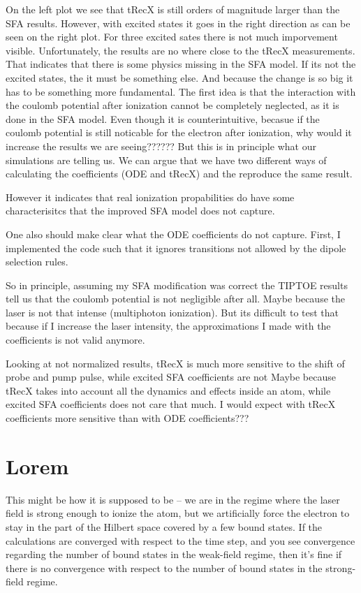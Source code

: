 On the left plot we see that tRecX is still orders of magnitude larger than the SFA results. 
However, with excited states it goes in the right direction as can be seen on the right plot. 
For three excited sates there is not much imporvement visible.
Unfortunately, the results are no where close to the tRecX measurements. That indicates that there is some physics missing in the SFA model.
If its not the excited states, the it must be something else.
And because the change is so big it has to be something more fundamental.
The first idea is that the interaction with the coulomb potential after ionization cannot be completely neglected, as it is done in the SFA model.
Even though it is counterintuitive, becasue if the coulomb potential is still noticable for the electron after ionization, why would it increase the results we are seeing??????
But this is in principle what our simulations are telling us. We can argue that we have two different ways of calculating the coefficients (ODE and tRecX) and the reproduce the same result.

However it indicates that real ionization propabilities do have some characterisitcs that the improved SFA model does not capture.

One also should make clear what the ODE coefficients do not capture. First, I implemented the code such that it ignores transitions not allowed by the dipole selection rules.

So in principle, assuming my SFA modification was correct the TIPTOE results tell us that the coulomb potential is not negligible after all. 
Maybe because the laser is not that intense (multiphoton ionization).
But its difficult to test that because if I increase the laser intensity, the approximations I made with the coefficients is not valid anymore.

Looking at not normalized results, tRecX is much more sensitive to the shift of probe and pump pulse, while excited SFA coefficients are not
Maybe because tRecX takes into account all the dynamics and effects inside an atom, while excited SFA coefficients does not care that much.
I would expect with tRecX coefficients more sensitive than with ODE coefficients???




\section{Lorem}
This might be how it is supposed to be -- we are in the regime where the laser field is strong enough to ionize the atom, 
but we artificially force the electron to stay in the part of the Hilbert space covered by a few bound states. 
If the calculations are converged with respect to the time step, and you see convergence regarding the number of bound states in the weak-field regime, 
then it's fine if there is no convergence with respect to the number of bound states in the strong-field regime.




